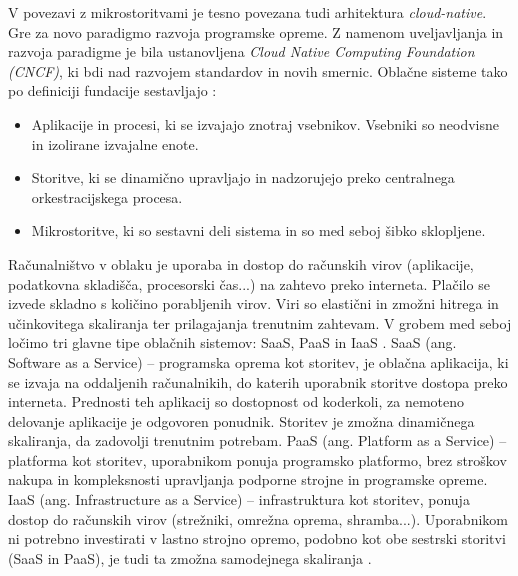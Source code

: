 \documentclass[a4paper, 12pt]{book}
\begin{document}
V povezavi z mikrostoritvami je tesno povezana tudi arhitektura \textit{cloud-native}.
Gre za novo paradigmo razvoja programske opreme.
Z namenom uveljavljanja in razvoja paradigme je bila ustanovljena \textit{Cloud Native Computing Foundation (CNCF)}, ki bdi nad razvojem standardov in novih smernic.
Oblačne sisteme tako po definiciji fundacije sestavljajo \cite{cncf}:
\begin{itemize}
	\item Aplikacije in procesi, ki se izvajajo znotraj vsebnikov. Vsebniki so neodvisne in izolirane izvajalne enote.
	\item Storitve, ki se dinamično upravljajo in nadzorujejo preko centralnega orkestracijskega procesa.
	\item Mikrostoritve, ki so sestavni deli sistema in so med seboj šibko sklopljene.
\end{itemize}

Računalništvo v oblaku je uporaba in dostop do računskih virov (aplikacije, podatkovna skladišča, procesorski čas...) na zahtevo preko interneta.
Plačilo se izvede skladno s količino porabljenih virov.
Viri so elastični in zmožni hitrega in učinkovitega skaliranja ter prilagajanja trenutnim zahtevam.
V grobem med seboj ločimo tri glavne tipe oblačnih sistemov: SaaS, PaaS in IaaS \cite{ibmCloudComputing}.
SaaS (ang. Software as a Service) -- programska oprema kot storitev, je oblačna aplikacija, ki se izvaja na oddaljenih računalnikih, do katerih uporabnik storitve dostopa preko interneta. 
Prednosti teh aplikacij so dostopnost od koderkoli, za nemoteno delovanje aplikacije je odgovoren ponudnik.
Storitev je zmožna dinamičnega skaliranja, da zadovolji trenutnim potrebam.
PaaS (ang. Platform as a Service) -- platforma kot storitev, uporabnikom ponuja programsko platformo, brez stroškov nakupa in kompleksnosti upravljanja podporne strojne in programske opreme.
IaaS (ang. Infrastructure as a Service) -- infrastruktura kot storitev, ponuja dostop do računskih virov (strežniki, omrežna oprema, shramba...).
Uporabnikom ni potrebno investirati v lastno strojno opremo, podobno kot obe sestrski storitvi (SaaS in PaaS), je tudi ta zmožna samodejnega skaliranja \cite{ibmCloudComputing, TOFFETTI2017165}.
\end{document}
